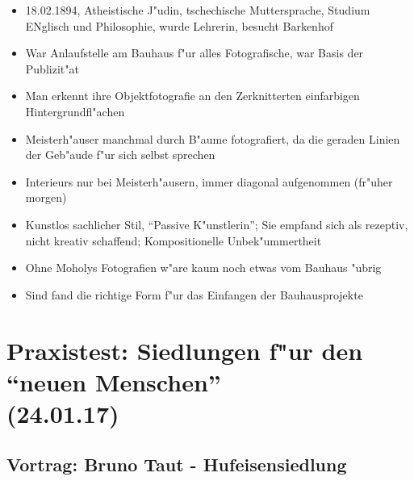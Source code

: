 \documentclass[emulatestandardclasses]{scrartcl}
\begin{document}
\begin{itemize}
  \item 18.02.1894, Atheistische J"udin, tschechische Muttersprache, Studium ENglisch und Philosophie, wurde Lehrerin, besucht Barkenhof
  \item War Anlaufstelle am Bauhaus f"ur alles Fotografische, war Basis der Publizit"at
  \item Man erkennt ihre Objektfotografie an den Zerknitterten einfarbigen Hintergrundfl"achen
  \item Meisterh"auser manchmal durch B"aume fotografiert, da die geraden Linien der Geb"aude f"ur sich selbst sprechen
  \item Interieurs nur bei Meisterh"ausern, immer diagonal aufgenommen (fr"uher morgen)
  \item Kunstlos sachlicher Stil, "`Passive K"unstlerin"'; Sie empfand sich als rezeptiv, nicht kreativ schaffend; Kompositionelle Unbek"ummertheit
  \item Ohne Moholys Fotografien w"are kaum noch etwas vom Bauhaus "ubrig
  \item Sind fand die richtige Form f"ur das Einfangen der Bauhausprojekte
\end{itemize}


\section{Praxistest: Siedlungen f"ur den "`neuen Menschen"'\\(24.01.17)}

\subsection{Vortrag: Bruno Taut - Hufeisensiedlung}
\end{document}
